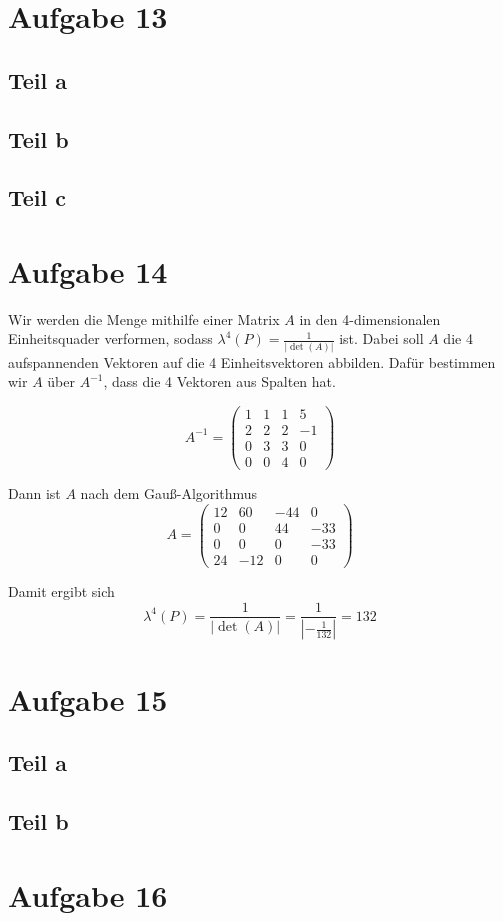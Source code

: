 \documentclass[10pt,a4paper]{article}
\begin{document}
\section{Aufgabe 13}

\subsection{Teil a}

\subsection{Teil b}

\subsection{Teil c}

\section{Aufgabe 14}
Wir werden die Menge mithilfe einer Matrix $A$ in den 4-dimensionalen Einheitsquader verformen, sodass $\lambda^{4}(P) = \frac{1}{|\det(A)|}$ ist.
Dabei soll $A$ die 4 aufspannenden Vektoren auf die 4 Einheitsvektoren abbilden.
Dafür bestimmen wir $A$ über $A^{-1}$, dass die 4 Vektoren aus Spalten hat.

\begin{equation}
  A^{-1} = 
  \begin{pmatrix}
    1 & 1 & 1 & 5\\
    2 & 2 & 2 & -1\\
    0 & 3 & 3 & 0\\
    0 & 0 & 4 & 0
  \end{pmatrix}
\end{equation}

Dann ist $A$ nach dem Gauß-Algorithmus
\begin{equation}
  A = 
  \begin{pmatrix}
    12 & 60 & -44 & 0\\
    0 & 0 & 44 & -33\\
    0 & 0 & 0 & -33\\
    24 & -12 & 0 & 0
  \end{pmatrix}
\end{equation}

Damit ergibt sich
\begin{equation}
  \lambda^{4}(P) = \frac{1}{|\det(A)|} = \frac{1}{|-\frac{1}{132}|} = 132
\end{equation}

\section{Aufgabe 15}

\subsection{Teil a}

\subsection{Teil b}

\section{Aufgabe 16}
\end{document}

